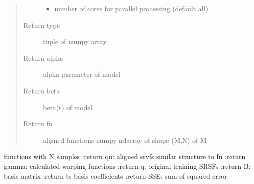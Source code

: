 \documentclass[letterpaper,10pt,english]{sphinxmanual}
\begin{document}
\begin{fulllineitems}
\begin{quote}
\begin{description}
\begin{itemize}
\item {} 
 \textendash{} number of cores for parallel processing (default all)

\end{itemize}

\item[{Return type}] \leavevmode
tuple of numpy array

\item[{Return alpha}] \leavevmode
alpha parameter of model

\item[{Return beta}] \leavevmode
beta(t) of model

\item[{Return fn}] \leavevmode
aligned functions \sphinxhyphen{} numpy ndarray of shape (M,N) of M

\end{description}\end{quote}

functions with N samples
:return qn: aligned srvfs \sphinxhyphen{} similar structure to fn
:return gamma: calculated warping functions
:return q: original training SRSFs
:return B: basis matrix
:return b: basis coefficients
:return SSE: sum of squared error

\end{fulllineitems}

\end{document}
